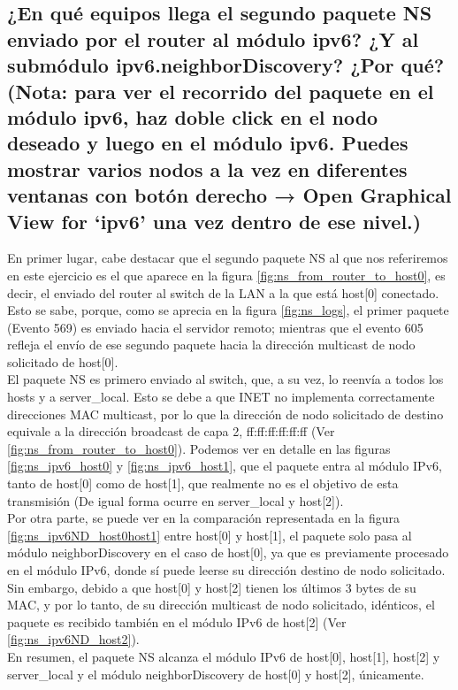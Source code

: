 \subsection{¿En qué equipos llega el segundo paquete NS enviado por el router al módulo ipv6? ¿Y al submódulo
ipv6.neighborDiscovery? ¿Por qué? (Nota: para ver el recorrido del paquete en el módulo ipv6, haz doble click en
el nodo deseado y luego en el módulo ipv6. Puedes mostrar varios nodos a la vez en diferentes ventanas con
botón derecho → Open Graphical View for ‘ipv6’ una vez dentro de ese nivel.)}

En primer lugar, cabe destacar que el segundo paquete NS al que nos referiremos en este ejercicio es el que aparece en la figura \ref{fig:ns_from_router_to_host0}, es decir, el enviado del router al switch de la LAN a la que está host[0] conectado. Esto se sabe, porque, como se aprecia en la figura \ref{fig:ns_logs}, el primer paquete (Evento 569) es enviado hacia el servidor remoto; mientras que el evento 605 refleja el envío de ese segundo paquete hacia la dirección multicast de nodo solicitado de host[0].\\
El paquete NS es primero enviado al switch, que, a su vez, lo reenvía a todos los hosts y a server\_local. Esto se debe a que INET no implementa correctamente direcciones MAC multicast, por lo que la dirección de nodo solicitado de destino equivale a la dirección broadcast de capa 2, ff:ff:ff:ff:ff:ff (Ver \ref{fig:ns_from_router_to_host0}). Podemos ver en detalle en las figuras \ref{fig:ns_ipv6_host0} y \ref{fig:ns_ipv6_host1}, que el paquete entra al módulo IPv6, tanto de host[0] como de host[1], que realmente no es el objetivo de esta transmisión (De igual forma ocurre en server\_local y host[2]).\\
Por otra parte, se puede ver en la comparación representada en la figura \ref{fig:ns_ipv6ND_host0host1} entre host[0] y host[1], el paquete solo pasa al módulo neighborDiscovery en el caso de host[0], ya que es previamente procesado en el módulo IPv6, donde sí puede leerse su dirección destino de nodo solicitado. Sin embargo, debido a que host[0] y host[2] tienen los últimos 3 bytes de su MAC, y por lo tanto, de su dirección multicast de nodo solicitado, idénticos, el paquete es recibido también en el módulo IPv6 de host[2] (Ver \ref{fig:ns_ipv6ND_host2}).\\
En resumen, el paquete NS alcanza el módulo IPv6 de host[0], host[1], host[2] y server\_local y el módulo neighborDiscovery de host[0] y host[2], únicamente. 

